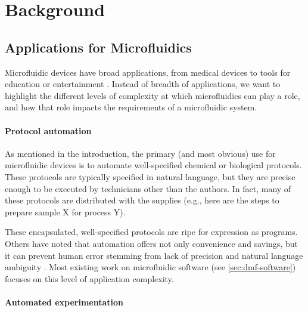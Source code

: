 \documentclass[sigconf, screen]{acmart}
\begin{document}
\section{Background}
\label{sec:background}

\subsection{Applications for Microfluidics}
Microfluidic devices have broad applications, from medical devices \cite{coelho2017digital} to tools for education or entertainment \cite{opendrop, mit-medialab}.
Instead of breadth of applications, we want to highlight the different levels of complexity at which microfluidics can play a role, and how that role impacts the requirements of a microfluidic system.

\paragraph{Protocol automation}
As mentioned in the introduction, the primary (and most obvious) use for microfluidic devices is to automate well-specified chemical or biological protocols.
These protocols are typically specified in natural language, but they are precise enough to be executed by technicians other than the authors.
In fact, many of these protocols are distributed with the supplies (e.g., here are the steps to prepare sample X for process Y).

These encapsulated, well-specified protocols are ripe for expression as programs.
Others have noted that automation offers not only convenience and savings, but it can prevent human error stemming from lack of precision and natural language ambiguity \cite{antha-qbd}.
Most existing work on microfluidic software (see \autoref{sec:dmf-software}) focuses on this level of application complexity.


\paragraph{Automated experimentation}
\end{document}
